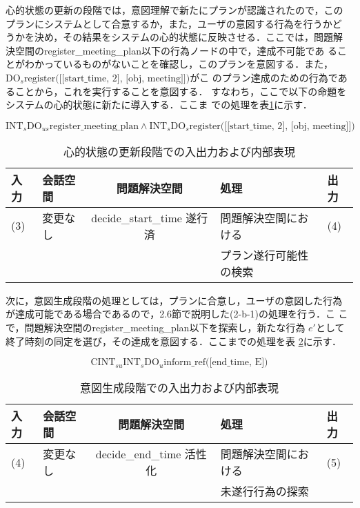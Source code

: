 心的状態の更新の段階では，意図理解で新たにプランが認識されたので，この
プランにシステムとして合意するか，また，ユーザの意図する行為を行うかど
うかを決め，その結果をシステムの心的状態に反映させる．ここでは，問題解
決空間のregister\_meeting\_plan以下の行為ノードの中で，達成不可能であ
ることがわかっているものがないことを確認し，このプランを意図する．また，
$\mbox{DO}_s \mbox{register([[start\_time, 2], [obj, meeting]])}$がこ
のプラン達成のための行為であることから，これを実行することを意図する．
すなわち，ここで以下の命題をシステムの心的状態に新たに導入する．ここま
での処理を表\ref{ex-table3}に示す．

\begin{equation}
\mbox{INT}_s \mbox{DO}_{us} \mbox{register\_meeting\_plan} \land
\mbox{INT}_s \mbox{DO}_s \mbox{register([[start\_time, 2], [obj, meeting]])}
\end{equation}

\begin{table}[htbp]
\centering
\caption{心的状態の更新段階での入出力および内部表現}
\label{ex-table3}
\begin{tabular}{|l|l|c|l|l|}
\hline
入力 & 会話空間 & 問題解決空間 & 処理 & 出力 \\
\hline
\hline
(3) & 変更なし  & decide\_start\_time 遂行済 & 問題解決空間における & (4) \\
 &   &  & プラン遂行可能性の検索 & \\
\hline
\end{tabular}
\end{table}

次に，意図生成段階の処理としては，プランに合意し，ユーザの意図した行為
が達成可能である場合であるので，2.6節で説明した(2-b-1)の処理を行う．こ
こで，問題解決空間のregister\_meeting\_plan以下を探索し，新たな行為
$e'$として終了時刻の同定を選び，その達成を意図する．ここまでの処理を表
\ref{ex-table4}に示す．

\begin{equation}
\mbox{CINT}_{su} \mbox{INT}_s 
\mbox{DO}_u \mbox{inform\_ref([end\_time, E])}
\end{equation}

\begin{table}[htbp]
\centering
\caption{意図生成段階での入出力および内部表現}
\label{ex-table4}
\begin{tabular}{|l|l|c|l|l|}
\hline
入力 & 会話空間 & 問題解決空間 & 処理 & 出力 \\
\hline
\hline
(4) & 変更なし & decide\_end\_time 活性化 & 問題解決空間における & (5)\\
&  & & 未遂行行為の探索 & \\
\hline
\end{tabular}
\end{table}

